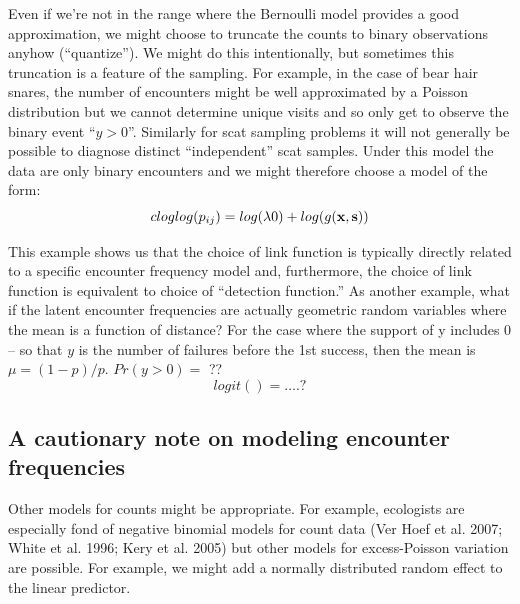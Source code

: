 Even if we're not in the range where the Bernoulli model provides a
good approximation, we might choose to truncate the counts to binary
observations anyhow (``quantize'').
We might do
this intentionally, but sometimes this truncation is a feature of the
sampling. For example, in the case of bear hair snares, the number of
encounters might be well approximated by a Poisson distribution but we
cannot determine unique visits and so only get to observe the binary
event ``$y>0$''. Similarly for scat sampling problems it will not
generally be possible to diagnose distinct ``independent'' scat
samples. Under this model the data are only binary encounters and we
might therefore choose a model of the form:
\[
 cloglog(p_{ij}) = log(\lambda0)  + log(g({\bf x},{\bf s}))
\]

This example shows us that the choice of link function is typically
directly related to a specific encounter frequency model and,
furthermore, the choice of link function is equivalent to choice of
``detection function.''
As another example, what if the latent encounter frequencies are actually geometric random variables where the mean is a function of distance? For the case where the support of y includes 0 – so that $y$ is the number of failures before the 1st success, then the mean is $\mu = (1-p)/p$. 
$Pr(y>0) =$  ??
\[
logit() = ….?
\]


\subsection{A cautionary note on modeling encounter frequencies}

Other models for counts might be appropriate. For example, ecologists
are especially fond of negative binomial models for count data (Ver
Hoef et al. 2007; White et al. 1996; Kery et al. 2005)
but other models for excess-Poisson variation are possible. For
example, we might add a normally distributed random effect to
the linear predictor.

